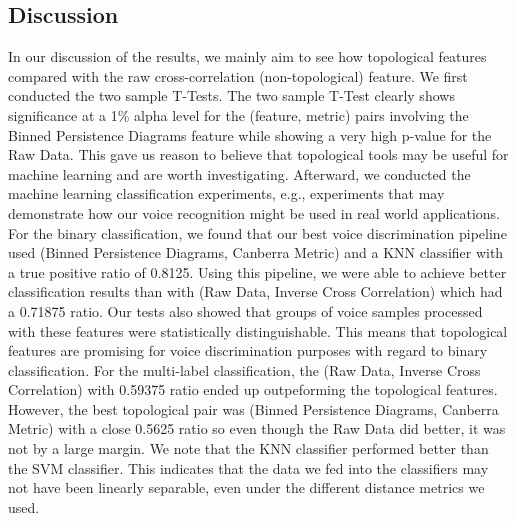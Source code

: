 \documentclass[12pt]{article}
\begin{document}
\subsection{Discussion}
\-\hspace{1cm} In our discussion of the results, we mainly aim to see how
topological features compared with the raw cross-correlation
(non-topological) feature. We first conducted the two sample T-Tests. The two
sample T-Test clearly shows significance at a 1\% alpha level for the (feature,
metric) pairs involving the Binned Persistence Diagrams feature while showing a
very high p-value for the Raw Data. This gave us reason to believe that
topological tools may be useful for machine learning and are worth
investigating.
\newline \-\hspace{1cm} Afterward, we conducted the machine learning
classification experiments, e.g., experiments that may demonstrate how our voice
recognition might be used in real world applications. For the binary
classification, we found that our best voice discrimination pipeline used
(Binned Persistence Diagrams, Canberra Metric) and a KNN classifier with a true
positive ratio of 0.8125. Using this pipeline, we were able to achieve better
classification results than with (Raw Data, Inverse Cross Correlation) which
had a 0.71875 ratio. Our tests also showed that groups of voice samples
processed with these features were statistically distinguishable. This means
that topological features are promising for voice discrimination purposes with
regard to binary classification. 
\newline \-\hspace{1cm} For the multi-label classification, the (Raw
Data, Inverse Cross Correlation) with 0.59375 ratio ended up outpeforming the
topological features. However, the best topological pair was (Binned
Persistence Diagrams, Canberra Metric) with a close 0.5625 ratio so even though
the Raw Data did better, it was not by a large margin. 
\newline \-\hspace{1cm} We note that the KNN classifier performed better than
the SVM classifier. This indicates that the data we fed into the classifiers
may not have been linearly separable, even under the different distance metrics
we used.
\end{document}
